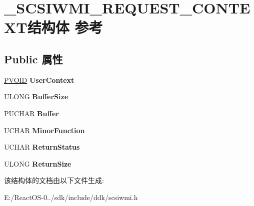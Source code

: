 \hypertarget{struct___s_c_s_i_w_m_i___r_e_q_u_e_s_t___c_o_n_t_e_x_t}{}\section{\+\_\+\+S\+C\+S\+I\+W\+M\+I\+\_\+\+R\+E\+Q\+U\+E\+S\+T\+\_\+\+C\+O\+N\+T\+E\+X\+T结构体 参考}
\label{struct___s_c_s_i_w_m_i___r_e_q_u_e_s_t___c_o_n_t_e_x_t}
\subsection*{Public 属性}
\begin{DoxyCompactItemize}
\item 
\mbox{\label{struct___s_c_s_i_w_m_i___r_e_q_u_e_s_t___c_o_n_t_e_x_t_a87b7bd0e96d0692cd39e69e60d400b41}} 
\hyperlink{interfacevoid}{P\+V\+O\+ID} {\bfseries User\+Context}
\item 
\mbox{\label{struct___s_c_s_i_w_m_i___r_e_q_u_e_s_t___c_o_n_t_e_x_t_a1053ca2fe659ca049aff5c887729de3a}} 
U\+L\+O\+NG {\bfseries Buffer\+Size}
\item 
\mbox{\label{struct___s_c_s_i_w_m_i___r_e_q_u_e_s_t___c_o_n_t_e_x_t_a533de6d85914980ac1701dd142b3799b}} 
P\+U\+C\+H\+AR {\bfseries Buffer}
\item 
\mbox{\label{struct___s_c_s_i_w_m_i___r_e_q_u_e_s_t___c_o_n_t_e_x_t_a667ccd965764260de415e40905c16a54}} 
U\+C\+H\+AR {\bfseries Minor\+Function}
\item 
\mbox{\label{struct___s_c_s_i_w_m_i___r_e_q_u_e_s_t___c_o_n_t_e_x_t_acb7a2f1f401f4aeb5df374d3a21aef8d}} 
U\+C\+H\+AR {\bfseries Return\+Status}
\item 
\mbox{\label{struct___s_c_s_i_w_m_i___r_e_q_u_e_s_t___c_o_n_t_e_x_t_aca718cc9881c6aed2a4d76c395be070e}} 
U\+L\+O\+NG {\bfseries Return\+Size}
\end{DoxyCompactItemize}


该结构体的文档由以下文件生成\+:\begin{DoxyCompactItemize}
\item 
E\+:/\+React\+O\+S-\/0../sdk/include/ddk/scsiwmi.\+h\end{DoxyCompactItemize}
